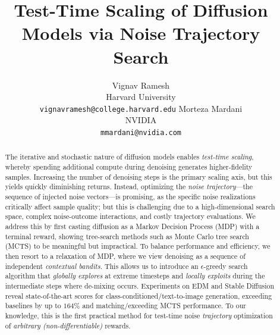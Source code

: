 \documentclass{article}
\author{%
  Vignav Ramesh \\
  Harvard University \\
  \texttt{vignavramesh@college.harvard.edu}
  \And
  Morteza Mardani \\
  NVIDIA \\
  \texttt{mmardani@nvidia.com}
}
\title{Test-Time Scaling of Diffusion Models via Noise Trajectory Search}
\begin{document}


\maketitle


\begin{abstract}
%
The iterative and stochastic nature of diffusion models enables \textit{test-time scaling}, whereby spending additional compute during denoising generates higher-fidelity samples. Increasing the number of denoising steps is the primary scaling axis, but this yields quickly diminishing returns. Instead, optimizing the \textit{noise trajectory}—the sequence of injected noise vectors—is promising, as the specific noise realizations critically affect sample quality; but this is challenging due to a high-dimensional search space, complex noise-outcome interactions, and costly trajectory evaluations. We address this by first casting diffusion as a Markov Decision Process (MDP) with a terminal reward, showing tree-search methods such as Monte Carlo tree search (MCTS) to be meaningful but impractical. To balance performance and efficiency, we then resort to a relaxation of MDP, where we view denoising as a sequence of independent \textit{contextual bandits}. This allows us to introduce an $\epsilon$-greedy search algorithm that \textit{globally explores} at extreme timesteps and \textit{locally exploits} during the intermediate steps where de-mixing occurs. Experiments on EDM and Stable Diffusion reveal state-of-the-art scores for class-conditioned/text-to-image generation, exceeding baselines by up to $164\%$ and matching/exceeding MCTS performance. To our knowledge, this is the first practical method for test-time noise \textit{trajectory} optimization of \textit{arbitrary (non-differentiable)} rewards. 

\end{abstract}



\end{document}

